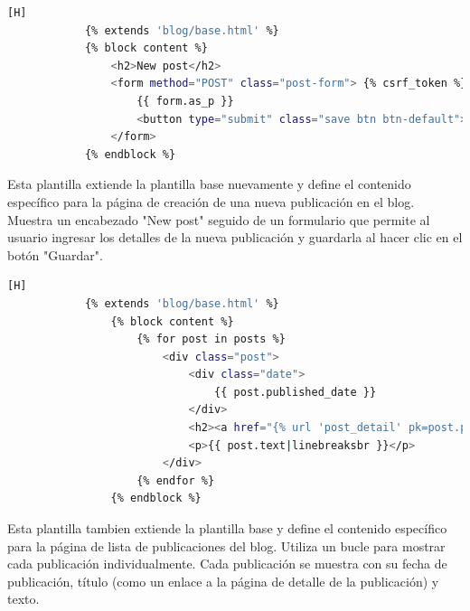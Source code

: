 \documentclass{article}
\begin{document}
        \begin{lstlisting}[language=bash,caption={post\_edit.html}][H]
            {% extends 'blog/base.html' %}
            {% block content %}
                <h2>New post</h2>
                <form method="POST" class="post-form"> {% csrf_token %}
                    {{ form.as_p }}
                    <button type="submit" class="save btn btn-default">Guardar</button>
                </form>
            {% endblock %}
	\end{lstlisting}
         Esta plantilla extiende la plantilla base nuevamente y define el contenido específico para la página de creación de una nueva publicación en el blog. Muestra un encabezado "New post" seguido de un formulario que permite al usuario ingresar los detalles de la nueva publicación y guardarla al hacer clic en el botón "Guardar".

         \begin{lstlisting}[language=bash,caption={post\_list.html}][H]
            {% extends 'blog/base.html' %}
                {% block content %}
                    {% for post in posts %}
                        <div class="post">
                            <div class="date">
                                {{ post.published_date }}
                            </div>
                            <h2><a href="{% url 'post_detail' pk=post.pk %}">{{ post.title }}</a></h2>
                            <p>{{ post.text|linebreaksbr }}</p>
                        </div>
                    {% endfor %}
                {% endblock %}
	\end{lstlisting}
        Esta plantilla tambien extiende la plantilla base y define el contenido específico para la página de lista de publicaciones del blog. Utiliza un bucle para mostrar cada publicación individualmente. Cada publicación se muestra con su fecha de publicación, título (como un enlace a la página de detalle de la publicación) y texto.
\end{document}
